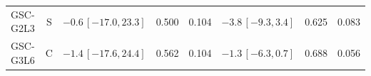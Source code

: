 \begin{longtable}{lcp{37mm}rrp{37mm}rr}
GSC-G2L3 & S & \(-0.6\,[-17.0,23.3]\) & 0.500 & 0.104 & \(-3.8\,[-9.3,3.4]\) & 0.625 & 0.083\\
GSC-G3L6 & C & \(-1.4\,[-17.6,24.4]\) & 0.562 & 0.104 & \(-1.3\,[-6.3,0.7]\) & 0.688 & 0.056\\

\end{longtable}
